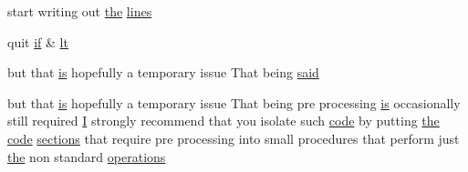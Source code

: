 \begin{DoxyCompactItemize}
\item 
start writing out \hyperlink{M__stopwatch_83_8txt_a0f266597de2e57eb3aa964927bb30e14}{the} \hyperlink{ufpp__overview_81_8txt_a38547e77f801e6266edc9bcd56b63a00}{lines}
\item 
quit \hyperlink{exit_87_8txt_a77395982f8d25581c808c40f3b634d90}{if} \& \hyperlink{ufpp__overview_81_8txt_a1bf2b9c519ae0b6e5f5b9f0a3866a054}{lt}
\item 
but that \hyperlink{intro__blas1_83_8txt_a42a91df93f840595de3019ceb5d1df23}{is} hopefully a temporary issue That being \hyperlink{ufpp__overview_81_8txt_a7f6c233b45fc747402eec6ec7e1e89fc}{said}
\item 
but that \hyperlink{intro__blas1_83_8txt_a42a91df93f840595de3019ceb5d1df23}{is} hopefully a temporary issue That being pre processing \hyperlink{intro__blas1_83_8txt_a42a91df93f840595de3019ceb5d1df23}{is} occasionally still required \hyperlink{continue_87_8txt_ae7b8826453d28f1bdb2fba7e889eb23b}{I} strongly recommend that you isolate such \hyperlink{ufpp__overview_81_8txt_a74a0615f2d9c4a398d9126096f8092f8}{code} by putting \hyperlink{M__stopwatch_83_8txt_a0f266597de2e57eb3aa964927bb30e14}{the} \hyperlink{ufpp__overview_81_8txt_a74a0615f2d9c4a398d9126096f8092f8}{code} \hyperlink{intro__blas1_83_8txt_aa06cca0b542e18027a508f939187fc96}{sections} that require pre processing into small procedures that perform just \hyperlink{M__stopwatch_83_8txt_a0f266597de2e57eb3aa964927bb30e14}{the} non standard \hyperlink{ufpp__overview_81_8txt_acc0f1fb4c8f484f4433c4e896cb04db7}{operations}
\item 

\end{DoxyCompactItemize}
